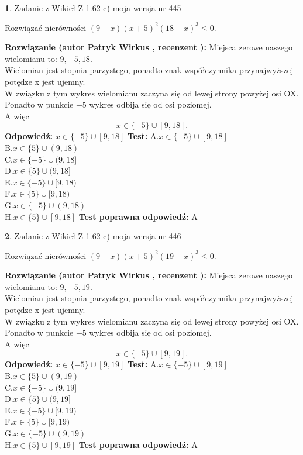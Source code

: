 \documentclass[12pt, a4paper]{article}
\theoremstyle{definition} %
\newtheorem{zad}{}
\newcommand{\zadStart}[1]{\begin{zad}#1\newline}
\newcommand{\zadStop}{\end{zad}}
\newcommand{\rozwStart}[2]{\noindent \textbf{Rozwiązanie (autor #1 , recenzent #2): }\newline}
\newcommand{\rozwStop}{\newline}
\newcommand{\odpStart}{\noindent \textbf{Odpowiedź:}\newline}
\newcommand{\odpStop}{\newline}
\newcommand{\testStart}{\noindent \textbf{Test:}\newline}
\newcommand{\testStop}{\newline}
\newcommand{\kluczStart}{\noindent \textbf{Test poprawna odpowiedź:}\newline}
\newcommand{\kluczStop}{\newline}
\begin{document}
\zadStart{Zadanie z Wikieł Z 1.62 c) moja wersja nr 445}

Rozwiązać nierówności $(9-x)(x+5)^{2}(18-x)^{3}\le0$.
\zadStop
\rozwStart{Patryk Wirkus}{}
Miejsca zerowe naszego wielomianu to: $9, -5, 18$.\\
Wielomian jest stopnia parzystego, ponadto znak współczynnika przy\linebreak najwyższej potędze x jest ujemny.\\ W związku z tym wykres wielomianu zaczyna się od lewej strony powyżej osi OX.\\
Ponadto w punkcie $-5$ wykres odbija się od osi poziomej.\\
A więc $$x \in \{-5\} \cup [9,18].$$
\rozwStop
\odpStart
$x \in \{-5\} \cup [9,18]$
\odpStop
\testStart
A.$x \in \{-5\} \cup [9,18]$\\
B.$x \in \{5\} \cup (9,18)$\\
C.$x \in \{-5\} \cup (9,18]$\\
D.$x \in \{5\} \cup (9,18]$\\
E.$x \in \{-5\} \cup [9,18)$\\
F.$x \in \{5\} \cup [9,18)$\\
G.$x \in \{-5\} \cup (9,18)$\\
H.$x \in \{5\} \cup [9,18]$
\testStop
\kluczStart
A
\kluczStop



\zadStart{Zadanie z Wikieł Z 1.62 c) moja wersja nr 446}

Rozwiązać nierówności $(9-x)(x+5)^{2}(19-x)^{3}\le0$.
\zadStop
\rozwStart{Patryk Wirkus}{}
Miejsca zerowe naszego wielomianu to: $9, -5, 19$.\\
Wielomian jest stopnia parzystego, ponadto znak współczynnika przy\linebreak najwyższej potędze x jest ujemny.\\ W związku z tym wykres wielomianu zaczyna się od lewej strony powyżej osi OX.\\
Ponadto w punkcie $-5$ wykres odbija się od osi poziomej.\\
A więc $$x \in \{-5\} \cup [9,19].$$
\rozwStop
\odpStart
$x \in \{-5\} \cup [9,19]$
\odpStop
\testStart
A.$x \in \{-5\} \cup [9,19]$\\
B.$x \in \{5\} \cup (9,19)$\\
C.$x \in \{-5\} \cup (9,19]$\\
D.$x \in \{5\} \cup (9,19]$\\
E.$x \in \{-5\} \cup [9,19)$\\
F.$x \in \{5\} \cup [9,19)$\\
G.$x \in \{-5\} \cup (9,19)$\\
H.$x \in \{5\} \cup [9,19]$
\testStop
\kluczStart
A
\kluczStop
\end{document}
